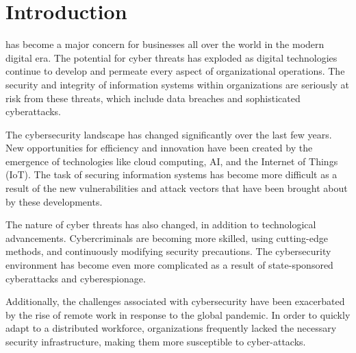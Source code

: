 \documentclass[journal]{IEEEtran}
\begin{document}
%
\IEEEpeerreviewmaketitle


\section{Introduction}

% 
% 
% 
% 
 has become a major concern for businesses all over the world in the modern digital era. The potential for cyber threats has exploded as digital technologies continue to develop and permeate every aspect of organizational operations. The security and integrity of information systems within organizations are seriously at risk from these threats, which include data breaches and sophisticated cyberattacks.

The cybersecurity landscape has changed significantly over the last few years. New opportunities for efficiency and innovation have been created by the emergence of technologies like cloud computing, AI, and the Internet of Things (IoT). The task of securing information systems has become more difficult as a result of the new vulnerabilities and attack vectors that have been brought about by these developments.

The nature of cyber threats has also changed, in addition to technological advancements. Cybercriminals are becoming more skilled, using cutting-edge methods, and continuously modifying security precautions. The cybersecurity environment has become even more complicated as a result of state-sponsored cyberattacks and cyberespionage.

Additionally, the challenges associated with cybersecurity have been exacerbated by the rise of remote work in response to the global pandemic. In order to quickly adapt to a distributed workforce, organizations frequently lacked the necessary security infrastructure, making them more susceptible to cyber-attacks.
\end{document}
